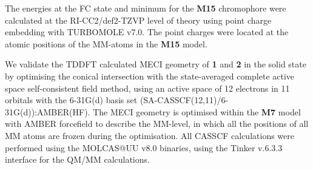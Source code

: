 The energies at the FC state and \Kstar{} minimum for the \textbf{M15} chromophore were calculated at the RI-CC2/def2-TZVP level of theory using point charge embedding with TURBOMOLE v7.0.\cite{Hattig2002,Turbomole} The point charges were located at the atomic positions of the MM-atoms in the \textbf{M15} model.

We validate the TDDFT calculated MECI geometry of \textbf{1} and \textbf{2} in the solid state by optimising the conical intersection with the state-averaged complete active space self-consistent field  method, using an active space of 12 electrons in 11 orbitals with the 6-31G(d) basis set (SA-CASSCF(12,11)/6-31G(d)):AMBER(HF). The MECI geometry is optimised within the \textbf{M7} model with AMBER forcefield to describe the MM-level, in which all the positions of all MM atoms are frozen during the optimisation. All CASSCF calculations were performed using the MOLCAS@UU v8.0 binaries, using  the Tinker v.6.3.3 interface for the QM/MM calculations. 

